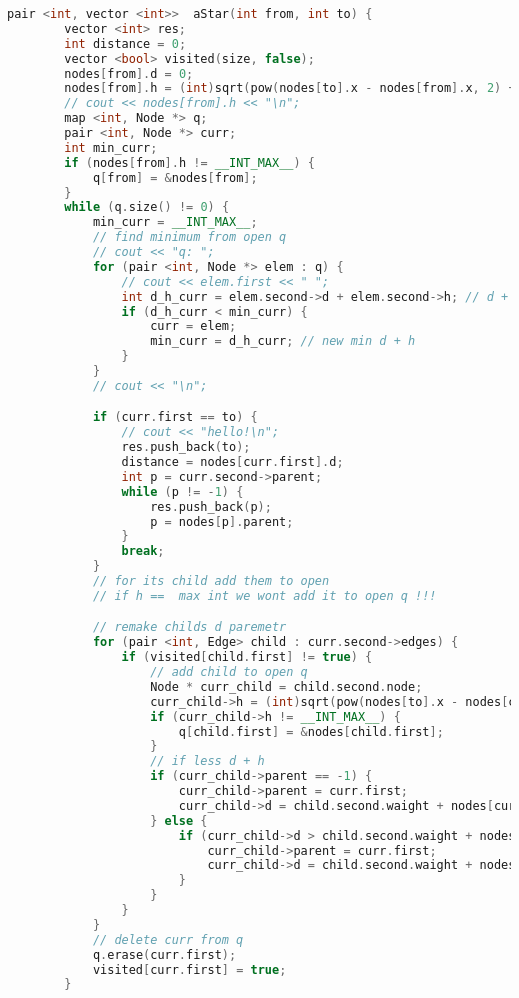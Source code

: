 \begin{lstlisting}[language=C++]
    pair <int, vector <int>>  aStar(int from, int to) {
        vector <int> res;
        int distance = 0;
        vector <bool> visited(size, false);
        nodes[from].d = 0;
        nodes[from].h = (int)sqrt(pow(nodes[to].x - nodes[from].x, 2) + pow(nodes[to].y - nodes[from].y, 2));
        // cout << nodes[from].h << "\n";
        map <int, Node *> q;
        pair <int, Node *> curr;
        int min_curr;
        if (nodes[from].h != __INT_MAX__) {
            q[from] = &nodes[from];
        }
        while (q.size() != 0) {
            min_curr = __INT_MAX__;
            // find minimum from open q
            // cout << "q: ";
            for (pair <int, Node *> elem : q) {
                // cout << elem.first << " ";
                int d_h_curr = elem.second->d + elem.second->h; // d + h of some in q
                if (d_h_curr < min_curr) {
                    curr = elem;
                    min_curr = d_h_curr; // new min d + h
                }
            }
            // cout << "\n";

            if (curr.first == to) {
                // cout << "hello!\n";
                res.push_back(to);
                distance = nodes[curr.first].d;
                int p = curr.second->parent;
                while (p != -1) {
                    res.push_back(p);
                    p = nodes[p].parent;
                }
                break;
            }
            // for its child add them to open
            // if h ==  max int we wont add it to open q !!!

            // remake childs d paremetr
            for (pair <int, Edge> child : curr.second->edges) {
                if (visited[child.first] != true) {
                    // add child to open q
                    Node * curr_child = child.second.node;
                    curr_child->h = (int)sqrt(pow(nodes[to].x - nodes[child.first].x, 2) + pow(nodes[to].y - nodes[child.first].y, 2));
                    if (curr_child->h != __INT_MAX__) {
                        q[child.first] = &nodes[child.first];
                    }
                    // if less d + h
                    if (curr_child->parent == -1) {
                        curr_child->parent = curr.first;
                        curr_child->d = child.second.waight + nodes[curr_child->parent].d;
                    } else {
                        if (curr_child->d > child.second.waight + nodes[curr.first].d) {
                            curr_child->parent = curr.first;
                            curr_child->d = child.second.waight + nodes[curr_child->parent].d;
                        }
                    }
                }
            }
            // delete curr from q
            q.erase(curr.first);
            visited[curr.first] = true;
        }


\end{lstlisting}
